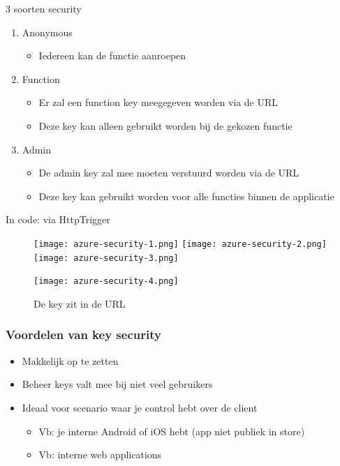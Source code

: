 \documentclass{article}
\begin{document}
3 soorten security

\begin{enumerate}
    \item Anonymous
    \begin{itemize}
        \item Iedereen kan de functie aanroepen
    \end{itemize}
    \item Function
    \begin{itemize}
        \item Er zal een function key meegegeven worden via de URL
        \item Deze key kan alleen gebruikt worden bij de gekozen functie
    \end{itemize}
    \item Admin 
    \begin{itemize}
        \item De admin key zal mee moeten verstuurd worden via de URL
        \item Deze key kan gebruikt worden voor alle functies binnen de applicatie
    \end{itemize}
\end{enumerate}

In code: via HttpTrigger

\begin{figure}[H]
    \centering
    \texttt{[image: azure-security-1.png]}
    \texttt{[image: azure-security-2.png]}
    \texttt{[image: azure-security-3.png]}
    \caption{}
\end{figure}

\begin{figure}[H]
    \centering
    \texttt{[image: azure-security-4.png]}
    \caption{De key zit in de URL}
\end{figure}

\subsubsection{Voordelen van key security}
\begin{itemize}
    \item Makkelijk op te zetten
    \item Beheer keys valt mee bij niet veel gebruikers
    \item Ideaal voor scenario waar je control hebt over de client
    \begin{itemize}
        \item Vb: je interne Android of iOS hebt (app niet publiek in store)
        \item Vb: interne web applications
    \end{itemize}
\end{itemize}
\end{document}
